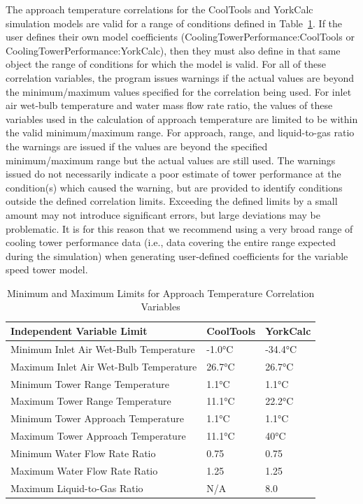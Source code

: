 The approach temperature correlations for the CoolTools and YorkCalc simulation models are valid for a range of conditions defined in Table~\ref{table:minimum-and-maximum-limits-for-approach}. If the user defines their own model coefficients (CoolingTowerPerformance:CoolTools or CoolingTowerPerformance:YorkCalc), then they must also define in that same object the range of conditions for which the model is valid. For all of these correlation variables, the program issues warnings if the actual values are beyond the minimum/maximum values specified for the correlation being used. For inlet air wet-bulb temperature and water mass flow rate ratio, the values of these variables used in the calculation of approach temperature are limited to be within the valid minimum/maximum range. For approach, range, and liquid-to-gas ratio the warnings are issued if the values are beyond the specified minimum/maximum range but the actual values are still used. The warnings issued do not necessarily indicate a poor estimate of tower performance at the condition(s) which caused the warning, but are provided to identify conditions outside the defined correlation limits. Exceeding the defined limits by a small amount may not introduce significant errors, but large deviations may be problematic. It is for this reason that we recommend using a very broad range of cooling tower performance data (i.e., data covering the entire range expected during the simulation) when generating user-defined coefficients for the variable speed tower model.

\begin{longtable}[c]{@{}lll@{}}
\caption{Minimum and Maximum Limits for Approach Temperature Correlation Variables \protect \label{table:minimum-and-maximum-limits-for-approach}}\\
\toprule 
Independent Variable Limit & CoolTools & YorkCalc \tabularnewline \midrule
\endhead
Minimum Inlet Air Wet-Bulb Temperature & -1.0°C & -34.4°C \tabularnewline
Maximum Inlet Air Wet-Bulb Temperature & 26.7°C & 26.7°C \tabularnewline
Minimum Tower Range Temperature & 1.1°C & 1.1°C \tabularnewline
Maximum Tower Range Temperature & 11.1°C & 22.2°C \tabularnewline
Minimum Tower Approach Temperature & 1.1°C & 1.1°C \tabularnewline
Maximum Tower Approach Temperature & 11.1°C & 40°C \tabularnewline
Minimum Water Flow Rate Ratio & 0.75 & 0.75 \tabularnewline
Maximum Water Flow Rate Ratio & 1.25 & 1.25 \tabularnewline
Maximum Liquid-to-Gas Ratio & N/A & 8.0 \tabularnewline
\bottomrule
\end{longtable}

